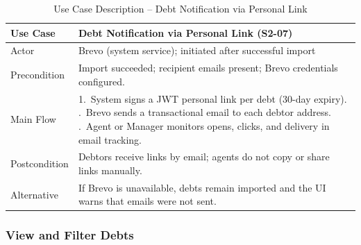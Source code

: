 \documentclass[12pt,a4paper]{report}
\newcommand{\reporttablesetup}{%
  \small%
  \setlength{\tabcolsep}{5pt}%
  \renewcommand{\arraystretch}{1.22}%
  \arrayrulecolor{framegray}%
}
\begin{document}
\begin{table}[H]
  \centering
  \reporttablesetup
  \begin{tabularx}{\textwidth}{|p{3.1cm}|Y|}
    \hline
    Use Case     & Debt Notification via Personal Link (S2-07) \\
    \hline
    Actor        & Brevo (system service); initiated after successful import \\
    \hline
    Precondition & Import succeeded; recipient emails present; Brevo credentials
                   configured. \\
    \hline
    Main Flow    & 1.\ System signs a JWT personal link per debt (30-day expiry).
                       .\ Brevo sends a transactional email to each debtor address.
                       .\ Agent or Manager monitors opens, clicks, and delivery in email
                       tracking. \\
    \hline
    Postcondition & Debtors receive links by email; agents do not copy or share links
                   manually. \\
    \hline
    Alternative  & If Brevo is unavailable, debts remain imported and the UI warns
                   that emails were not sent. \\
    \hline
  \end{tabularx}
  \caption{Use Case Description -- Debt Notification via Personal Link}
  \label{tab:uc-s2-03}
\end{table}

\subsubsection{View and Filter Debts}
\end{document}
